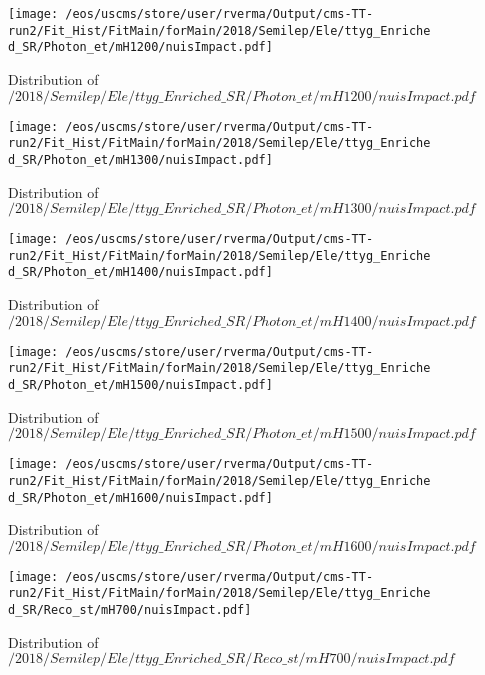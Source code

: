 \begin{figure}
\centering
\texttt{[image: /eos/uscms/store/user/rverma/Output/cms-TT-run2/Fit\_Hist/FitMain/forMain/2018/Semilep/Ele/ttyg\_Enriched\_SR/Photon\_et/mH1200/nuisImpact.pdf]}
\caption{Distribution of $/2018/Semilep/Ele/ttyg\_Enriched\_SR/Photon\_et/mH1200/nuisImpact.pdf$}
\end{figure}

\begin{figure}
\centering
\texttt{[image: /eos/uscms/store/user/rverma/Output/cms-TT-run2/Fit\_Hist/FitMain/forMain/2018/Semilep/Ele/ttyg\_Enriched\_SR/Photon\_et/mH1300/nuisImpact.pdf]}
\caption{Distribution of $/2018/Semilep/Ele/ttyg\_Enriched\_SR/Photon\_et/mH1300/nuisImpact.pdf$}
\end{figure}

\begin{figure}
\centering
\texttt{[image: /eos/uscms/store/user/rverma/Output/cms-TT-run2/Fit\_Hist/FitMain/forMain/2018/Semilep/Ele/ttyg\_Enriched\_SR/Photon\_et/mH1400/nuisImpact.pdf]}
\caption{Distribution of $/2018/Semilep/Ele/ttyg\_Enriched\_SR/Photon\_et/mH1400/nuisImpact.pdf$}
\end{figure}

\begin{figure}
\centering
\texttt{[image: /eos/uscms/store/user/rverma/Output/cms-TT-run2/Fit\_Hist/FitMain/forMain/2018/Semilep/Ele/ttyg\_Enriched\_SR/Photon\_et/mH1500/nuisImpact.pdf]}
\caption{Distribution of $/2018/Semilep/Ele/ttyg\_Enriched\_SR/Photon\_et/mH1500/nuisImpact.pdf$}
\end{figure}

\begin{figure}
\centering
\texttt{[image: /eos/uscms/store/user/rverma/Output/cms-TT-run2/Fit\_Hist/FitMain/forMain/2018/Semilep/Ele/ttyg\_Enriched\_SR/Photon\_et/mH1600/nuisImpact.pdf]}
\caption{Distribution of $/2018/Semilep/Ele/ttyg\_Enriched\_SR/Photon\_et/mH1600/nuisImpact.pdf$}
\end{figure}

\begin{figure}
\centering
\texttt{[image: /eos/uscms/store/user/rverma/Output/cms-TT-run2/Fit\_Hist/FitMain/forMain/2018/Semilep/Ele/ttyg\_Enriched\_SR/Reco\_st/mH700/nuisImpact.pdf]}
\caption{Distribution of $/2018/Semilep/Ele/ttyg\_Enriched\_SR/Reco\_st/mH700/nuisImpact.pdf$}
\end{figure}

